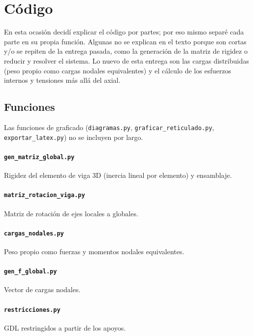 \newpage
\section*{Código}

En esta ocasión decidí explicar el código por partes; por eso mismo separé cada
parte en su propia función. Algunas no se explican en el texto porque son cortas
y/o se repiten de la entrega pasada, como la generación de la matriz de rigidez o
reducir y resolver el sistema. Lo nuevo de esta entrega son las cargas
distribuidas (peso propio como cargas nodales equivalentes) y el cálculo de los
esfuerzos internos y tensiones más allá del axial.
\subsection*{Funciones}

Las funciones de graficado (\texttt{diagramas.py},
\texttt{graficar\_reticulado.py}, \texttt{exportar\_latex.py}) no se incluyen
por largo.

\paragraph{\texttt{gen\_matriz\_global.py}} Rigidez del elemento de viga 3D (inercia lineal por elemento) y ensamblaje.


\paragraph{\texttt{matriz\_rotacion\_viga.py}} Matriz de rotaci\'on de ejes locales a globales.


\paragraph{\texttt{cargas\_nodales.py}} Peso propio como fuerzas y momentos nodales equivalentes.


\paragraph{\texttt{gen\_f\_global.py}} Vector de cargas nodales.


\paragraph{\texttt{restricciones.py}} GDL restringidos a partir de los apoyos.


